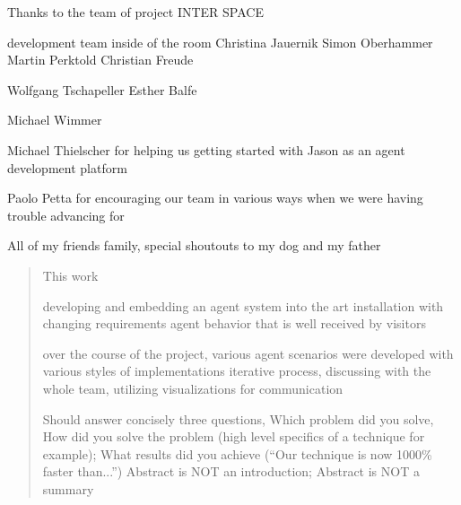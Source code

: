 \documentclass[draft,final]{vutinfth} %
\begin{document}
\frontmatter %

\glsunsetall


\glsresetall

\addstatementpage

\begin{danksagung*}



\end{danksagung*}

\begin{acknowledgements*}
Thanks to the team of project INTER SPACE

development team inside of the room
Christina Jauernik
Simon Oberhammer
Martin Perktold
Christian Freude

Wolfgang Tschapeller
Esther Balfe

Michael Wimmer

Michael Thielscher
for helping us getting started with Jason as an agent development platform

Paolo Petta 
for encouraging our team in various ways when we were having trouble advancing
for

All of my friends family, 
special shoutouts to my dog and my father


\end{acknowledgements*}

\begin{kurzfassung}
\end{kurzfassung}

\begin{abstract}

This work 

developing and embedding an agent system into the art installation with changing requirements
agent behavior that is well received by visitors

over the course of the project, various agent scenarios were developed with various styles of implementations
iterative process, discussing with the whole team, utilizing visualizations for communication

Should answer concisely three questions, Which problem did you solve, How did you solve the problem (high level specifics of a technique for example); What results did you achieve (“Our technique is now 1000\% faster than...”)
Abstract is NOT an introduction; Abstract is NOT a summary


\end{abstract}
\end{document}
